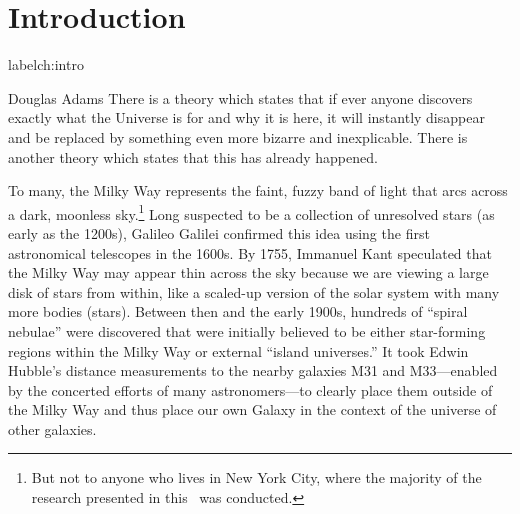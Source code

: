 \chapter[Introduction]{Introduction} label{ch:intro}




\vspace{-16pt} \begin{chapquote}{Douglas Adams} \singlespacing There is a theory
which states that if ever anyone discovers exactly what the Universe is for and
why it is here, it will instantly disappear and be replaced by something even
more bizarre and inexplicable. There is another theory which states that this
has already happened. \end{chapquote} \vspace{-8pt}
\noindent\makebox[\linewidth]{\rule{0.5\textwidth}{0.5pt}} \vspace{1pt}

To many, the Milky Way represents the faint, fuzzy band of light that arcs
across a dark, moonless sky.\footnote{But not to anyone who lives in New York
City, where the majority of the research presented in this \article\ was
conducted.} Long suspected to be a collection of unresolved stars (as early as
the 1200s), Galileo Galilei confirmed this idea using the first astronomical
telescopes in the 1600s. By 1755, Immanuel Kant speculated that the Milky Way
may appear thin across the sky because we are viewing a large disk of stars from
within, like a scaled-up version of the solar system with many more bodies
(stars). Between then and the early 1900s, hundreds of ``spiral nebulae'' were
discovered that were initially believed to be either star-forming regions within
the Milky Way or external ``island universes.'' It took Edwin Hubble's distance
measurements to the nearby galaxies M31 and M33---enabled by the concerted
efforts of many astronomers---to clearly place them outside of the Milky Way and
thus place our own Galaxy in the context of the universe of other galaxies.

